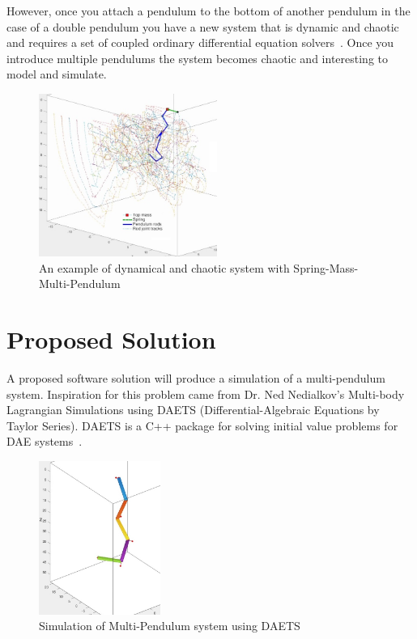 \documentclass{article}
\begin{document}
However, once you attach a pendulum to the bottom of another pendulum in the
case of a double pendulum you have a new system that is dynamic and chaotic and
requires a set of coupled ordinary differential equation 
solvers~\cite{DoublePendulum}. Once you introduce multiple pendulums the system 
becomes chaotic and interesting to model and simulate.

\begin{figure}[h]
	\centering
	\includegraphics[width=220px]{multi-pend.jpg}
	\caption{An example of dynamical and chaotic system with
	Spring-Mass-Multi-Pendulum~\cite{MLSim}}
	\label{fig:multipend}
\end{figure}

\section*{Proposed Solution}
A proposed software solution will produce a simulation of a multi-pendulum
system. Inspiration for this problem came from Dr. Ned Nedialkov's Multi-body
Lagrangian Simulations using DAETS (Differential-Algebraic Equations by Taylor
Series). DAETS is a C++ package for solving initial value problems for DAE
systems~\cite{DAETS}.

\begin{figure}[h]
	\centering
	\includegraphics[width=150px]{3pend.jpg}
	\caption{Simulation of Multi-Pendulum system using 
	DAETS~\cite{MLSim}}
	\label{fig:simpendula}
\end{figure}
\end{document}
